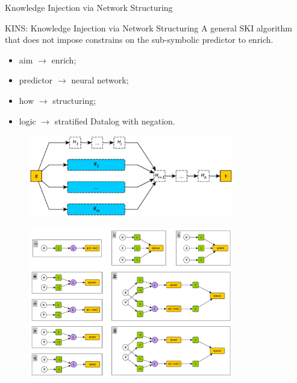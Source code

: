 \documentclass[presentation]{beamer}\mode<presentation>{\usetheme{AMSBolognaFC}}
\begin{document}
\begin{frame}[allowframebreaks]{Knowledge Injection via Network Structuring}
    
    \begin{block}{KINS: Knowledge Injection via Network Structuring}
        A general SKI algorithm that does not impose constrains on the sub-symbolic predictor to enrich.
        \begin{itemize}
            \item aim $\rightarrow$ enrich;
            \item predictor $\rightarrow$ neural network;
            \item how $\rightarrow$ structuring;
            \item logic $\rightarrow$ stratified Datalog with negation.
        \end{itemize}        
    \end{block}

    \framebreak
    
    \begin{figure}
        \centering
        \includegraphics[width=0.8\textwidth]{figures/kins-architecture}
    \end{figure}

    \framebreak
    
    
    
    \framebreak
    
    \begin{figure}
        \centering
        \includegraphics[width=0.8\textwidth]{figures/kins-fuzzifier-modules}
    \end{figure}

    \framebreak
    
    
    
\end{frame}
\end{document}
